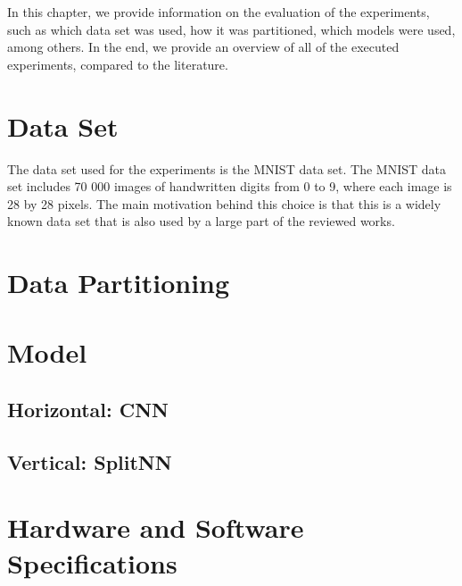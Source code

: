 \todo{}

In this chapter, we provide information on the evaluation of the experiments, such as which data set was used, how it was partitioned, which models were used, among others. In the end, we provide an overview of all of the executed experiments, compared to the literature.

\section{Data Set}

The data set used for the experiments is the MNIST \cite{lecun2010mnist} data set. The MNIST data set includes 70 000 images of handwritten digits from 0 to 9, where each image is 28 by 28 pixels. The main motivation behind this choice is that this is a widely known data set that is also used by a large part of the reviewed works.

\section{Data Partitioning}


\section{Model}

\subsection{Horizontal: CNN}


\subsection{Vertical: SplitNN}

\section{Hardware and Software Specifications}

